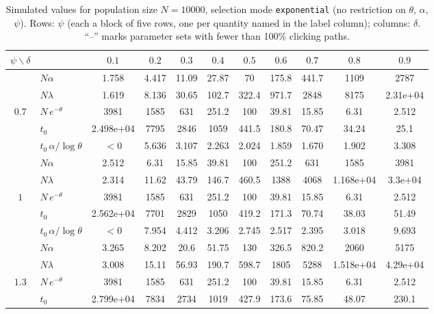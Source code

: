 \documentclass[10pt]{article}
\begin{document}
\begin{table}[t]
\centering
\caption{Simulated values for population size $N=10000$, selection mode
\texttt{exponential} (no restriction on $\theta$, $\alpha$, $\psi$).
Rows: $\psi$ (each a block of five rows, one per quantity named in the label
column); columns: $\delta$. ``--'' marks parameter sets with fewer than
100\% clicking paths.}
\setlength{\tabcolsep}{4pt}
\begin{adjustbox}{max width=\textwidth, max totalheight=0.9\textheight, center}
\scriptsize
\begin{tabular}{c lccccccccc}
\toprule
$\psi \backslash \delta$ &  & $0.1$ & $0.2$ & $0.3$ & $0.4$ & $0.5$ & $0.6$ & $0.7$ & $0.8$ & $0.9$ \\
\midrule
 & $N\alpha$ & 1.758 & 4.417 & 11.09 & 27.87 & 70 & 175.8 & 441.7 & 1109 & 2787 \\
 & $N\lambda$ & 1.619 & 8.136 & 30.65 & 102.7 & 322.4 & 971.7 & 2848 & 8175 & 2.31e+04 \\
$0.7$ & $N\,e^{-\theta}$ & 3981 & 1585 & 631 & 251.2 & 100 & 39.81 & 15.85 & 6.31 & 2.512 \\
 & $t_0$ & 2.498e+04 & 7795 & 2846 & 1059 & 441.5 & 180.8 & 70.47 & 34.24 & 25.1 \\
 & $t_0\,\alpha/\log\theta$ & $<0$ & 5.636 & 3.107 & 2.263 & 2.024 & 1.859 & 1.670 & 1.902 & 3.308 \\
\midrule
 & $N\alpha$ & 2.512 & 6.31 & 15.85 & 39.81 & 100 & 251.2 & 631 & 1585 & 3981 \\
 & $N\lambda$ & 2.314 & 11.62 & 43.79 & 146.7 & 460.5 & 1388 & 4068 & 1.168e+04 & 3.3e+04 \\
$1$ & $N\,e^{-\theta}$ & 3981 & 1585 & 631 & 251.2 & 100 & 39.81 & 15.85 & 6.31 & 2.512 \\
 & $t_0$ & 2.562e+04 & 7701 & 2829 & 1050 & 419.2 & 171.3 & 70.74 & 38.03 & 51.49 \\
 & $t_0\,\alpha/\log\theta$ & $<0$ & 7.954 & 4.412 & 3.206 & 2.745 & 2.517 & 2.395 & 3.018 & 9.693 \\
\midrule
 & $N\alpha$ & 3.265 & 8.202 & 20.6 & 51.75 & 130 & 326.5 & 820.2 & 2060 & 5175 \\
 & $N\lambda$ & 3.008 & 15.11 & 56.93 & 190.7 & 598.7 & 1805 & 5288 & 1.518e+04 & 4.29e+04 \\
$1.3$ & $N\,e^{-\theta}$ & 3981 & 1585 & 631 & 251.2 & 100 & 39.81 & 15.85 & 6.31 & 2.512 \\
 & $t_0$ & 2.799e+04 & 7834 & 2734 & 1019 & 427.9 & 173.6 & 75.85 & 48.07 & 230.1 \\

\end{tabular}
\end{adjustbox}
\end{table}
\end{document}
